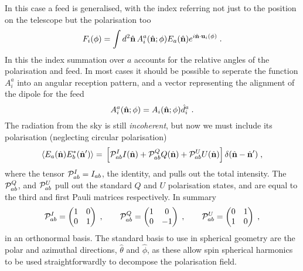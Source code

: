 \documentclass[onecolumn]{revtex4}
\begin{document}
In this case a feed is generalised, with the index referring not just to the
position on the telescope but the polarisation too
\begin{equation}
  F_i(\phi) = \int d^2\hat{\mathbf{n}} \, A^a_i(\hat{\mathbf{n}}; \phi) E_a(\hat{\mathbf{n}}) e^{i
    \hat{\mathbf{n}}\cdot\mathbf{u}_i(\phi)}\; .
\end{equation}
In this the index summation over $a$ accounts for the relative angles of the
polarisation and feed. In most cases it should be possible to seperate the
function $A_i^a$ into an angular reception pattern, and a vector representing
the alignment of the dipole for the feed
\begin{equation}
  A_i^a(\hat{\mathbf{n}}; \phi) = A_i(\hat{\mathbf{n}}; \phi) \hat{d}^a_i \; .
\end{equation}
The radiation from the sky is still \emph{incoherent}, but now we must include
its polarisation (neglecting circular polarisation)
\begin{equation}
  \left\langle E_a(\hat{\mathbf{n}}) E_b^* (\hat{\mathbf{n}}') \right\rangle = \\ \left[\mathcal{P}_{ab}^I
    I(\hat{\mathbf{n}}) + \mathcal{P}_{ab}^Q Q(\hat{\mathbf{n}}) + \mathcal{P}_{ab}^U U(\hat{\mathbf{n}})\right]\delta(\hat{\mathbf{n}} - \hat{\mathbf{n}}') \; ,
\end{equation}
where the tensor $\mathcal{P}^I_{ab} = I_{ab}$, the identity, and pulls out the total
intensity. The $\mathcal{P}^Q_{ab}$, and $\mathcal{P}^U_{ab}$ pull out the standard $Q$ and
$U$ polarisation states, and are equal to the third and first Pauli matrices
respectively. In summary
\begin{equation}
\mathcal{P}^I_{ab} = \begin{pmatrix} 1 & 0 \\ 0 & 1\end{pmatrix} \; ,
\qquad
\mathcal{P}^Q_{ab} = \begin{pmatrix} 1 & 0 \\ 0 & -1\end{pmatrix} \; ,
\qquad
\mathcal{P}^U_{ab} = \begin{pmatrix} 0 & 1 \\ 1 & 0\end{pmatrix} \; ,
\end{equation}
in an orthonormal basis. The standard basis to use in spherical geometry are the
polar and azimuthal directions, $\hat{\theta}$ and $\hat{\phi}$, as these allow
spin spherical harmonics to be used straightforwardly to decompose the
polarisation field.
\end{document}
